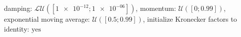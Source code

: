 damping: $\mathcal{LU}([\num[scientific-notation=true]{1e-12}; \num[scientific-notation=true]{1e-06}])$, momentum: $\mathcal{U}([\num[scientific-notation=false]{0}; \num[scientific-notation=true]{0.99}])$, exponential moving average: $\mathcal{U}([\num[scientific-notation=true]{0.5}; \num[scientific-notation=true]{0.99}])$, initialize Kronecker factors to identity: $\text{yes}$